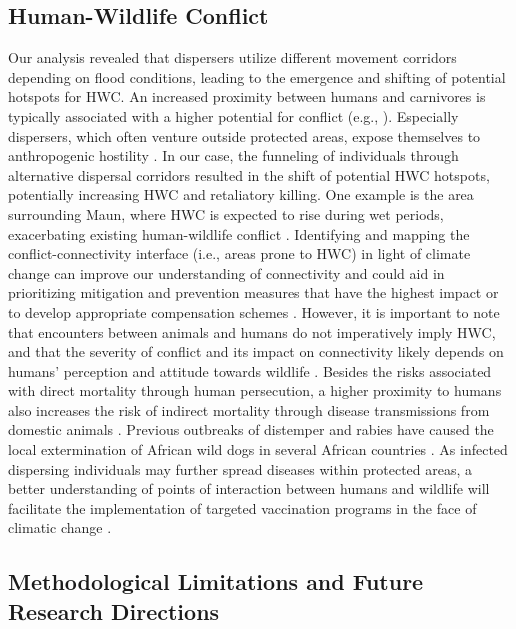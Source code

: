 \documentclass[abstract=on,10pt,a4paper,bibliography=totocnumbered]{article}
\begin{document}
\subsection{Human-Wildlife Conflict}

Our analysis revealed that dispersers utilize different movement corridors
depending on flood conditions, leading to the emergence and shifting of
potential hotspots for HWC. An increased proximity between humans and carnivores
is typically associated with a higher potential for conflict (e.g.,
\citealp{Michalski.2006, Chapman.2016}). Especially dispersers, which often
venture outside protected areas, expose themselves to anthropogenic hostility
\citep{Elliot.2014, Cozzi.2020, Vasudev.2023}. In our case, the funneling of
individuals through alternative dispersal corridors resulted in the shift of
potential HWC hotspots, potentially increasing HWC and retaliatory killing. One
example is the area surrounding Maun, where HWC is expected to rise during wet
periods, exacerbating existing human-wildlife conflict \citep{Gusset.2009,
McNutt.2017, Cozzi.2020}. Identifying and mapping the conflict-connectivity
interface (i.e., areas prone to HWC) in light of climate change can improve our
understanding of connectivity \citep{Vasudev.2023} and could aid in prioritizing
mitigation and prevention measures that have the highest impact
\citep{Treves.2011, Buchholtz.2020} or to develop appropriate compensation
schemes \citep{McNutt.2017}. However, it is important to note that encounters
between animals and humans do not imperatively imply HWC, and that the severity
of conflict and its impact on connectivity likely depends on humans' perception
and attitude towards wildlife \citep{Ghoddousi.2021}. Besides the risks
associated with direct mortality through human persecution, a higher proximity
to humans also increases the risk of indirect mortality through disease
transmissions from domestic animals \citep{Cleaveland.2000, VanDeBildt.2002}.
Previous outbreaks of distemper and rabies have caused the local extermination
of African wild dogs in several African countries \citep{Woodroffe.2004}. As
infected dispersing individuals may further spread diseases within protected
areas, a better understanding of points of interaction between humans and
wildlife will facilitate the implementation of targeted vaccination programs in
the face of climatic change \citep{Vial.2006}.

\subsection{Methodological Limitations and Future Research Directions}
\end{document}
